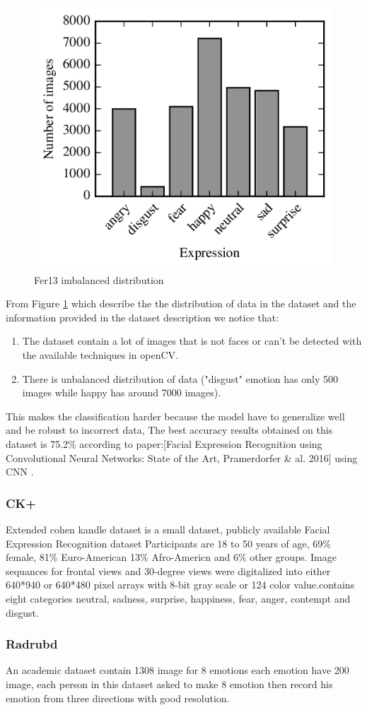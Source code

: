 \begin{figure}
	\centering
	\includegraphics[width=.5\textwidth]{images/fer_dis.png}
	\caption{Fer13 imbalanced distribution}
	\label{fig:fer13}
\end{figure}
From Figure \ref{fig:fer13} which describe the the distribution of data in the dataset and the information provided in the dataset description we notice that:
\begin{enumerate}
	\item The dataset contain a lot of images that is not faces or can't be detected with the available techniques in openCV.
	\item There is unbalanced distribution of data ("disgust" emotion has only 500 images while happy has around 7000 images).
\end{enumerate}

This makes the classification harder because the model have to generalize well and be robust to incorrect data, The best accuracy results obtained on this dataset is 75.2\% according to paper:\cite{state_of_art}[Facial Expression Recognition using Convolutional Neural Networks: State of the Art, Pramerdorfer \& al. 2016] using CNN .

\subsubsection{CK+}
Extended cohen kandle dataset is a small dataset, publicly available Facial Expression Recognition dataset Participants are 18 to 50 years of age, 69\% female, 81\% Euro-American 13\% Afro-Americn and 6\% other groups.
\newline
Image sequances for frontal views and 30-degree views were digitalized into either 640*940 or 640*480 pixel arrays with 8-bit gray scale or 124 color value.contains eight categories neutral, sadness, surprise, happiness, fear, anger, contempt and disgust.

\subsubsection{Radrubd}
An academic dataset contain 1308 image for 8 emotions each emotion have 200 image, each person in this dataset asked to make 8 emotion then record his emotion from three directions with good resolution.
